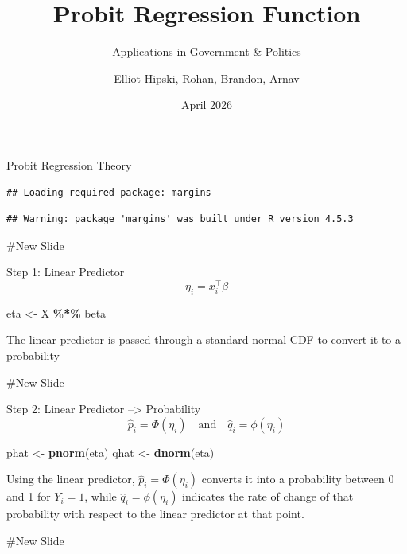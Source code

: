 \documentclass[
  ignorenonframetext,
]{beamer}
\title{\texorpdfstring{Probit Regression
Function}{Probit Regression Function}}
\subtitle{\texorpdfstring{Applications in Government \&
Politics}{Applications in Government \& Politics}}
\author{\texorpdfstring{Elliot Hipski, Rohan, Brandon,
Arnav}{Elliot Hipski, Rohan, Brandon, Arnav}}
\date{April 2026}
\newenvironment{Shaded}{\begin{snugshade}}{\end{snugshade}}
\newcommand{\FunctionTok}[1]{\textcolor[rgb]{0.13,0.29,0.53}{\textbf{#1}}}
\newcommand{\NormalTok}[1]{#1}
\newcommand{\OtherTok}[1]{\textcolor[rgb]{0.56,0.35,0.01}{#1}}
\newcommand{\SpecialCharTok}[1]{\textcolor[rgb]{0.81,0.36,0.00}{\textbf{#1}}}
\begin{document}
\frame{\titlepage}

\begin{frame}[fragile]{Probit Regression Theory}
\protect{}\label{probit-regression-theory}
\begin{verbatim}
## Loading required package: margins
\end{verbatim}

\begin{verbatim}
## Warning: package 'margins' was built under R version 4.5.3
\end{verbatim}

\#New Slide

\begin{block}{Step 1: Linear Predictor}
\protect{}\label{step-1-linear-predictor}
\[
\eta_i = x_i^\top \beta
\]

\begin{Shaded}
\begin{Highlighting}[]
\NormalTok{eta }\OtherTok{\textless{}{-}}\NormalTok{ X }\SpecialCharTok{\%*\%}\NormalTok{ beta}
\end{Highlighting}
\end{Shaded}

The linear predictor is passed through a standard normal CDF to convert
it to a probability

\#New Slide
\end{block}

\begin{block}{Step 2: Linear Predictor --\textgreater{} Probability}
\protect{}\label{step-2-linear-predictor-probability}
\[
\hat{p}_i = \Phi(\eta_i) \quad \text{and} \quad \hat{q}_i = \phi(\eta_i)
\]

\begin{Shaded}
\begin{Highlighting}[]
\NormalTok{phat }\OtherTok{\textless{}{-}} \FunctionTok{pnorm}\NormalTok{(eta)}
\NormalTok{qhat }\OtherTok{\textless{}{-}} \FunctionTok{dnorm}\NormalTok{(eta)}
\end{Highlighting}
\end{Shaded}

Using the linear predictor, \(\hat{p}_i = \Phi(\eta_i)\) converts it
into a probability between 0 and 1 for \(Y_i = 1\), while
\(\hat{q}_i = \phi(\eta_i)\) indicates the rate of change of that
probability with respect to the linear predictor at that point.

\#New Slide
\end{block}


\end{frame}
\end{document}
